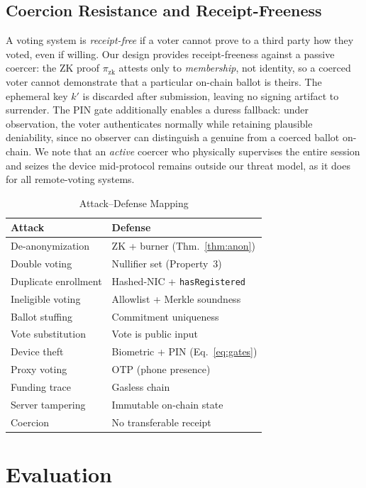 \documentclass[conference]{IEEEtran}
\theoremstyle{definition}
\theoremstyle{plain}
\begin{document}
\subsection{Coercion Resistance and Receipt-Freeness}
A voting system is \emph{receipt-free} if a voter cannot prove to a third party how they voted, even if willing. Our design provides receipt-freeness against a passive coercer: the ZK proof $\pi_{\text{zk}}$ attests only to \emph{membership}, not identity, so a coerced voter cannot demonstrate that a particular on-chain ballot is theirs. The ephemeral key $k'$ is discarded after submission, leaving no signing artifact to surrender. The PIN gate additionally enables a duress fallback: under observation, the voter authenticates normally while retaining plausible deniability, since no observer can distinguish a genuine from a coerced ballot on-chain. We note that an \emph{active} coercer who physically supervises the entire session and seizes the device mid-protocol remains outside our threat model, as it does for all remote-voting systems.

\begin{table}[t]
\caption{Attack--Defense Mapping}
\centering\small
\begin{tabular}{@{}ll@{}}
\toprule
\textbf{Attack} & \textbf{Defense} \\
\midrule
De-anonymization & ZK + burner (Thm.~\ref{thm:anon}) \\
Double voting & Nullifier set (Property~3) \\
Duplicate enrollment & Hashed-NIC + \texttt{hasRegistered} \\
Ineligible voting & Allowlist + Merkle soundness \\
Ballot stuffing & Commitment uniqueness \\
Vote substitution & Vote is public input \\
Device theft & Biometric + PIN (Eq.~\ref{eq:gates}) \\
Proxy voting & OTP (phone presence) \\
Funding trace & Gasless chain \\
Server tampering & Immutable on-chain state \\
Coercion & No transferable receipt \\
\bottomrule
\end{tabular}
\label{tab:threats}
\end{table}

\section{Evaluation}
\end{document}
